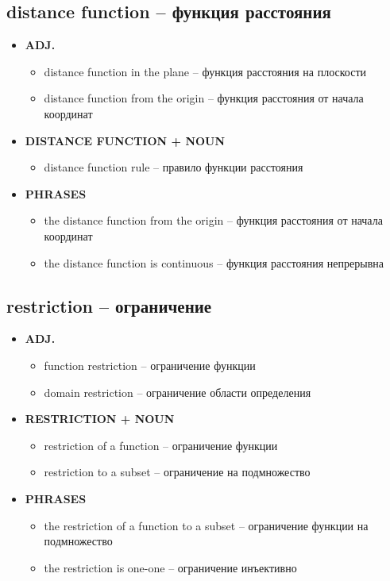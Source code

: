 \documentclass[a4paper, 10pt]{article}
\theoremstyle{definition}
\theoremstyle{plain}
\theoremstyle{remark}
\begin{document}
\subsection{distance function – функция расстояния}

\begin{itemize}
    \item \textbf{ADJ.}
    \begin{itemize}
        \item distance function in the plane – функция расстояния на плоскости
        \item distance function from the origin – функция расстояния от начала координат
    \end{itemize}
    
    \item \textbf{DISTANCE FUNCTION + NOUN}
    \begin{itemize}
        \item distance function rule – правило функции расстояния
    \end{itemize}
    
    \item \textbf{PHRASES}
    \begin{itemize}
        \item the distance function from the origin – функция расстояния от начала координат
        \item the distance function is continuous – функция расстояния непрерывна
    \end{itemize}
\end{itemize}

\subsection{restriction – ограничение}

\begin{itemize}
    \item \textbf{ADJ.}
    \begin{itemize}
        \item function restriction – ограничение функции
        \item domain restriction – ограничение области определения
    \end{itemize}
    
    \item \textbf{RESTRICTION + NOUN}
    \begin{itemize}
        \item restriction of a function – ограничение функции
        \item restriction to a subset – ограничение на подмножество
    \end{itemize}
    
    \item \textbf{PHRASES}
    \begin{itemize}
        \item the restriction of a function to a subset – ограничение функции на подмножество
        \item the restriction is one-one – ограничение инъективно
    \end{itemize}
\end{itemize}
\end{document}
